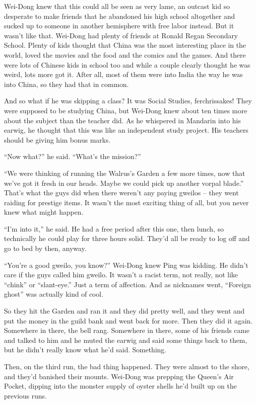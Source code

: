 Wei-Dong knew that this could all be seen as very lame, an outcast
kid so desperate to make friends that he abandoned his high school
altogether and sucked up to someone in another hemisphere with free
labor instead. But it wasn't like that. Wei-Dong had plenty of
friends at Ronald Regan Secondary School. Plenty of kids thought
that China was the most interesting place in the world, loved the
movies and the food and the comics and the games. And there were
lots of Chinese kids in school too and while a couple clearly
thought he was weird, lots more got it. After all, most of them
were into India the way he was into China, so they had that in
common.

And so what if he was skipping a class? It was Social Studies,
ferchrissakes! They were supposed to be studying China, but
Wei-Dong knew about ten times more about the subject than the
teacher did. As he whispered in Mandarin into his earwig, he
thought that this was like an independent study project. His
teachers should be giving him bonus marks.

``Now what?'' he said. ``What's the mission?''

``We were thinking of running the Walrus's Garden a few more times,
now that we've got it fresh in our heads. Maybe we could pick up
another vorpal blade.'' That's what the guys did when there weren't
any paying gweilos -- they went raiding for prestige items. It
wasn't the most exciting thing of all, but you never knew what
might happen.

``I'm into it,'' he said. He had a free period after this one, then
lunch, so technically he could play for three hours solid. They'd
all be ready to log off and go to bed by then, anyway.

``You're a good gweilo, you know?'' Wei-Dong knew Ping was kidding.
He didn't care if the guys called him gweilo. It wasn't a racist
term, not really, not like ``chink'' or ``slant-eye.'' Just a term of
affection. And as nicknames went, ``Foreign ghost'' was actually kind
of cool.

So they hit the Garden and ran it and they did pretty well, and
they went and put the money in the guild bank and went back for
more. Then they did it again. Somewhere in there, the bell rang.
Somewhere in there, some of his friends came and talked to him and
he muted the earwig and said some things back to them, but he
didn't really know what he'd said. Something.

Then, on the third run, the bad thing happened. They were almost to
the shore, and they'd banished their mounts. Wei-Dong was prepping
the Queen's Air Pocket, dipping into the monster supply of oyster
shells he'd built up on the previous runs.

